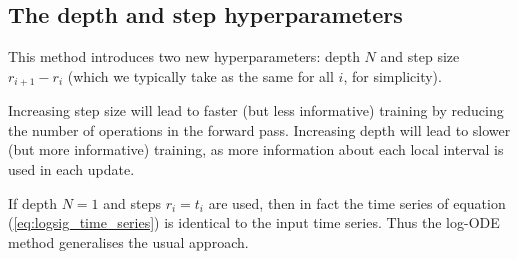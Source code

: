 \subsection{The depth and step hyperparameters} \label{subsec:tradeoff}
This method introduces two new hyperparameters: depth $N$ and step size $r_{i+1} - r_i$ (which we typically take as the same for all $i$, for simplicity).

Increasing step size will lead to faster (but less informative) training by reducing the number of operations in the forward pass. Increasing depth will lead to slower (but more informative) training, as more information about each local interval is used in each update.

If depth $N=1$ and steps $r_i = t_i$ are used, then in fact the time series of equation (\ref{eq:logsig_time_series}) is identical to the input time series. Thus the log-ODE method generalises the usual approach.


